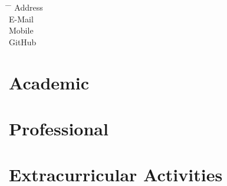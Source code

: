 \documentclass[12pt]{report} %
\begin{document}






\begin{tabbing}
\hspace{3cm} \= \hspace{4cm} \= \kill %
Address \> \varAddress\\
E-Mail  \> \href{mailto:\varEmail}{\varEmail} \\
Mobile  \> \varMobile \\
\DoIfNotEmpty{\varGithub}
{GitHub \> \href{\varGithub}{\varGithub} \\}%
\end{tabbing}



\section{Academic}

\education{}
\begin{list}{}%
         {\setlength{\leftmargin}{0.19\linewidth}}%
         \item[]%
{\small{\color{gray}\varEducationInfo{}}}
\end{list}


\section{Professional}

\professional{}


\section{Extracurricular Activities}
\end{document}
